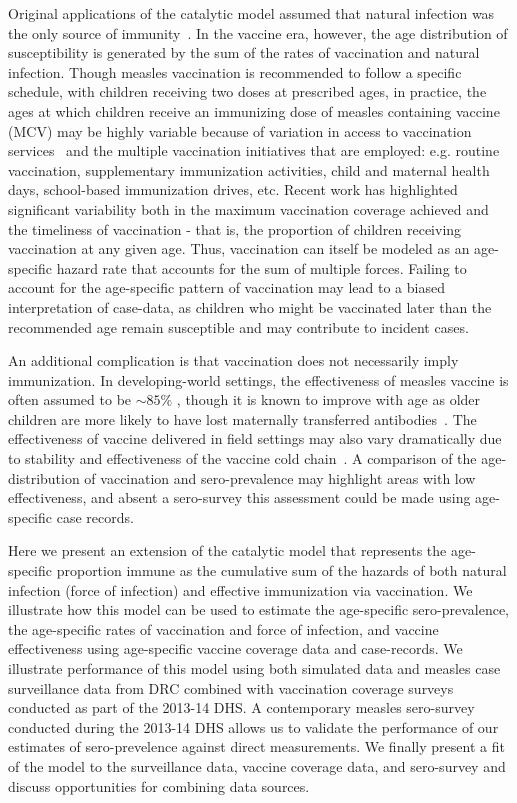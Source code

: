 \documentclass[nofootinbib,aps,pre,twocolumn,superscriptaddress,showkeys,showpacs]{revtex4-1}
\begin{document}
Original applications of the catalytic model assumed that natural infection was the only source of immunity~\cite{griffiths_catalytic_1974}.  
In the vaccine era, however, the age distribution of susceptibility is generated by the sum of the rates of vaccination and natural infection. 
Though measles vaccination is recommended to follow a specific schedule, with children receiving two doses at prescribed ages, in practice, the ages at which children receive an immunizing dose of measles containing vaccine (MCV) may be highly variable because of variation in access to vaccination services~\cite{METCALF2017S14,TRENTINI20171089,Winter2018Sero} and the multiple vaccination initiatives that are employed: e.g. routine vaccination, supplementary immunization activities, child and maternal health days, school-based immunization drives, etc.
Recent work has highlighted significant variability both in the maximum vaccination coverage achieved and the timeliness of vaccination - that is, the proportion of children receiving vaccination at any given age. Thus, vaccination can itself be modeled as an age-specific hazard rate that accounts for the sum of multiple forces.
Failing to account for the age-specific pattern of vaccination may lead to a biased interpretation of case-data, as children who might be vaccinated later than the recommended age remain susceptible and may contribute to incident cases. 

An additional complication is that vaccination does not necessarily imply immunization.  
In developing-world settings, the effectiveness of measles vaccine is often assumed to be $\sim 85 \%$ , though it is known to improve with age as older children are more likely to have lost maternally transferred antibodies~\cite{Uzicanin2011}. The effectiveness of vaccine delivered in field settings may also vary dramatically due to stability and effectiveness of the vaccine cold chain~\cite{Doshi2017}.  
A comparison of the age-distribution of vaccination and sero-prevalence may highlight areas with low effectiveness, and absent a sero-survey this assessment could be made using age-specific case records.

Here we present an extension of the catalytic model that represents the age-specific proportion immune as the cumulative sum of the hazards of both natural infection (force of infection) and effective immunization via vaccination.
We illustrate how this model can be used to estimate the age-specific sero-prevalence,  the age-specific rates of vaccination and force of infection, and vaccine effectiveness using age-specific vaccine coverage data and case-records. 
We illustrate performance of this model using both simulated data and measles case surveillance data from DRC combined with vaccination coverage surveys conducted as part of the 2013-14 DHS.  
A contemporary measles sero-survey conducted during the 2013-14 DHS allows us to validate the performance of our estimates of sero-prevelence against direct measurements. 
We finally present a fit of the model to the surveillance data, vaccine coverage data, and sero-survey and discuss opportunities for combining data sources.
\end{document}
